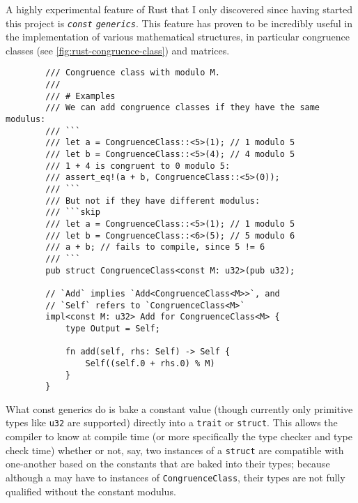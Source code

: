 \documentclass{report}
\newenvironment{code}{\captionsetup{type=listing}}{}
\begin{document}
A highly experimental feature of Rust that I only discovered since having
started this project is \emph{\Verb+const+ \Verb+generics+}. This feature has proven to
be incredibly useful in the implementation of various mathematical structures,
in particular congruence classes (see \cref{fig:rust-congruence-class}) and
matrices.
\begin{code}
    \begin{verbatim}
        /// Congruence class with modulo M.
        ///
        /// # Examples
        /// We can add congruence classes if they have the same modulus:
        /// ```
        /// let a = CongruenceClass::<5>(1); // 1 modulo 5
        /// let b = CongruenceClass::<5>(4); // 4 modulo 5
        /// 1 + 4 is congruent to 0 modulo 5:
        /// assert_eq!(a + b, CongruenceClass::<5>(0));
        /// ```
        /// But not if they have different modulus:
        /// ```skip
        /// let a = CongruenceClass::<5>(1); // 1 modulo 5
        /// let b = CongruenceClass::<6>(5); // 5 modulo 6
        /// a + b; // fails to compile, since 5 != 6
        /// ```
        pub struct CongruenceClass<const M: u32>(pub u32);

        // `Add` implies `Add<CongruenceClass<M>>`, and
        // `Self` refers to `CongruenceClass<M>`
        impl<const M: u32> Add for CongruenceClass<M> {
            type Output = Self;

            fn add(self, rhs: Self) -> Self {
                Self((self.0 + rhs.0) % M)
            }
        }
    \end{verbatim}
    \caption{%
        Excerpt of my implementation of congruence classes in Rust,
        using traits and the const generic feature.
    }
    \label{fig:rust-congruence-class}
\end{code}
\noindent
What const generics do is bake a constant value (though currently
only primitive types like \Verb+u32+ are supported) directly into a \Verb+trait+
or \Verb+struct+. This allows the compiler to know at compile time (or more
specifically the type checker and type check time) whether or not, say, two
instances of a \Verb+struct+ are compatible with one-another based on the
constants that are baked into their types; because although a may have to
instances of \Verb+CongruenceClass+, their types are not fully qualified
without the constant modulus.
\end{document}
